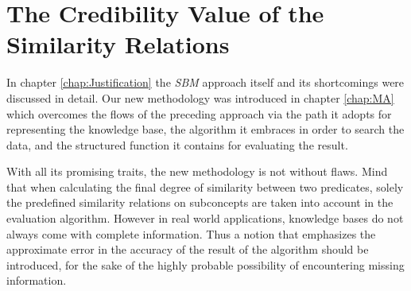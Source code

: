 \documentclass[egilmezThesis.tex]{subfiles}
\begin{document}
\chapter{The Credibility Value of the Similarity Relations}
\label{chap:error}

In chapter \ref{chap:Justification} the \textit{SBM} approach\cite{Lu} itself and its shortcomings were discussed in detail. Our new methodology was introduced in chapter \ref{chap:MA} which overcomes the flows of the preceding approach via the path it adopts for representing the knowledge base, the algorithm it embraces in order to search the data, and the structured function it contains for evaluating the result.

With all its promising traits, the new methodology is not without flaws. Mind that when calculating the final degree of similarity between two predicates, solely the predefined similarity relations on subconcepts are taken into account in the evaluation algorithm. However in real world applications, knowledge bases do not always come with complete information. Thus a notion that emphasizes the approximate error in the accuracy of the result of the algorithm should be introduced, for the sake of the highly probable possibility of encountering missing information.
\end{document}
